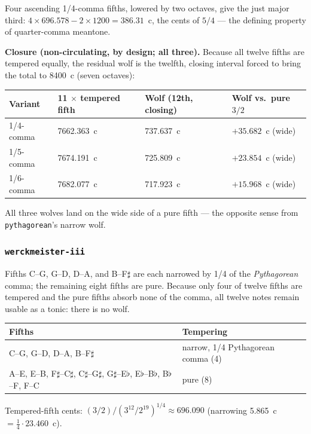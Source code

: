 \documentclass[11pt,letterpaper]{report}
\begin{document}
Four ascending 1/4-comma fifths, lowered by two octaves, give the just
major third: $4 \times 696.578 - 2 \times 1200 = 386.31$~c, the cents of
$5/4$ --- the defining property of quarter-comma meantone.

\textbf{Closure (non-circulating, by design; all three).} Because all
twelve fifths are tempered equally, the residual wolf is the twelfth,
closing interval forced to bring the total to 8400~c (seven octaves):

\begin{longtable}{p{2.6cm} p{3.4cm} p{3.6cm} p{3.4cm}}
  \toprule
  \textbf{Variant} & \textbf{11 $\times$ tempered fifth} &
  \textbf{Wolf (12th, closing)} & \textbf{Wolf vs.\ pure $3/2$} \\
  \midrule
  \endhead
  1/4-comma & 7662.363~c & 737.637~c & $+35.682$~c (wide) \\
  1/5-comma & 7674.191~c & 725.809~c & $+23.854$~c (wide) \\
  1/6-comma & 7682.077~c & 717.923~c & $+15.968$~c (wide) \\
  \bottomrule
\end{longtable}

All three wolves land on the wide side of a pure fifth --- the opposite
sense from \texttt{pythagorean}'s narrow wolf.

\subsubsection{\texttt{werckmeister-iii}}

Fifths C--G, G--D, D--A, and B--F$\sharp$ are each narrowed by 1/4 of
the \emph{Pythagorean} comma; the remaining eight fifths are pure.
Because only four of twelve fifths are tempered and the pure fifths
absorb none of the comma, all twelve notes remain usable as a tonic:
there is no wolf.

\begin{longtable}{p{9.5cm} p{2.5cm}}
  \toprule
  \textbf{Fifths} & \textbf{Tempering} \\
  \midrule
  \endhead
  C--G, G--D, D--A, B--F$\sharp$ & narrow, 1/4 Pythagorean comma (4) \\
  A--E, E--B, F$\sharp$--C$\sharp$, C$\sharp$--G$\sharp$,
    G$\sharp$--E$\flat$, E$\flat$--B$\flat$, B$\flat$--F, F--C &
    pure (8) \\
  \bottomrule
\end{longtable}

Tempered-fifth cents: $(3/2)/(3^{12}/2^{19})^{1/4} \approx 696.090$
(narrowing 5.865~c $= \tfrac{1}{4} \cdot 23.460$~c).
\end{document}
